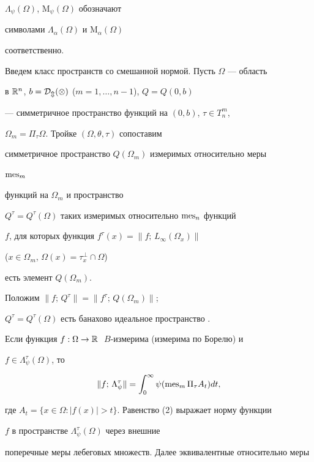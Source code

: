 $\Lambda_\psi(\Omega)$, $\mathrm M_\psi(\Omega)$ обозначают 


символами $\Lambda_\alpha(\Omega)$ и $\mathrm M_\alpha(\Omega)$ 


соответственно. 


 


Введем класс пространств со смешанной нормой. Пусть $\Omega$ --- область 


в $\Bbb R^n$, $b=\cal D_m(\Omega)$ ($m=1,\dotsc,n-1$), $Q=Q(0,b)$ 


--- симметричное пространство функций на $(0,b)$, $\tau\in T^m_n$, 


$\Omega_m=\Pi_\tau\Omega$. Тройке $(\Omega, \theta,\tau)$ сопоставим 


симметричное пространство $Q(\Omega_m)$ измеримых относительно меры 


$\operatorname{mes}_m$ 


функций на $\Omega_m$ и пространство 


$Q^\tau=Q^\tau(\Omega)$ таких измеримых относительно $\operatorname{mes}_n$ функций 


$f$, для которых функция $f^\tau(x)=\|f;\,L_\infty(\Omega_x)\|$ 


($x\in\Omega_m$, $\Omega(x)=\tau_x^\perp\cap\Omega$) 


есть элемент $Q(\Omega_m)$. 


Положим $\|f;\,Q^\tau\|=\|f^\tau;\,Q(\Omega_m)\|$; 


$Q^\tau=Q^\tau(\Omega)$ есть банахово идеальное пространство \cite{Za}. 


 


Если функция $f:\Omega\to\Bbb R\;$ $B$-измерима (измерима по Борелю) и 


$f\in\Lambda^\tau_\psi(\Omega)$, то 


\begin{equation} 




\|f;\,\Lambda_\psi^\tau\|=\int_0^\infty\psi(\mes_m\Pi_\tau A_t)dt, 


\end{equation} 


где $A_t=\{x\in\Omega:|f(x)|>t\}$. Равенство (2) выражает норму функции 


$f$ в пространстве $\Lambda_\psi^\tau(\Omega)$ через внешние 


поперечные меры лебеговых множеств. Далее эквивалентные относительно меры 



